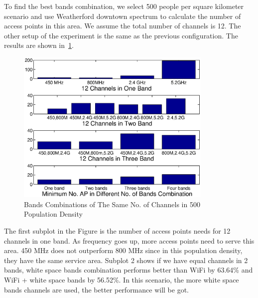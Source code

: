 To find the best bands combination, we select 500 people per square kilometer scenario and use Weatherford 
downtown spectrum to calculate the number of access points in this area. We assume the total number of channels 
is 12. The other setup of the experiment is 
the same as the previous configuration. The results are shown in~\ref{fig:varybandcomb}.
   \begin{figure}
   \centering
   \includegraphics[width=94mm]{figures/varybandcomb}
   \vspace{-0.1in}
   \caption{Bands Combinations of The Same No. of Channels in 500 Population Density}                                                                 
   \label{fig:varybandcomb}
   \end{figure}

The first subplot in the Figure is the number of access points needs for 12 channels in one band.
As frequency goes up, more access points need to serve this area. 450 MHz does not outperform 
800 MHz since in this population density, they have the same service area.
Subplot 2 shows if we have equal channels in 2 bands, white space bands combination performs better
than WiFi by 63.64\% and WiFi + white space bands by 56.52\%. In this scenario, the more white space bands channels are 
used, the better performance will be got.


